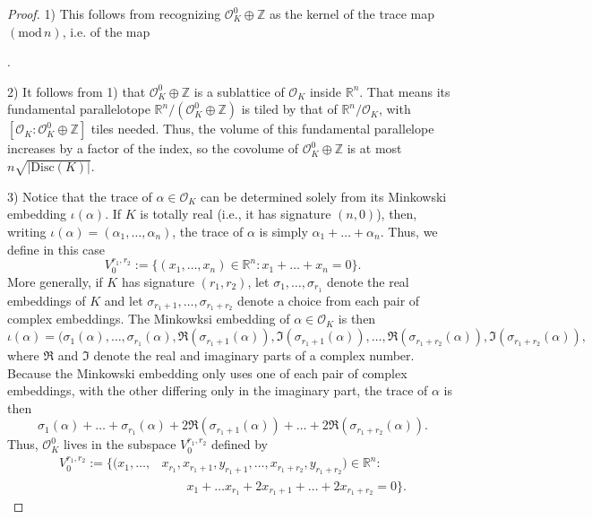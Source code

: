 \documentclass[12pt]{amsart}
\theoremstyle{definition} \newtheorem*{notation}{Notation}
\theoremstyle{remark} \newtheorem*{remark}{Remark}
\theoremstyle{remark} \newtheorem*{example}{Example}
\theoremstyle{definition} \newtheorem*{definition}{Definition}
\theoremstyle{definition} \newtheorem*{question}{Question}
\numberwithin{equation}{section}
\numberwithin{theorem}{section}
\renewcommand{\pmod}[1]{\left(\mathrm{mod}\,#1\right)}
\begin{document}
	\begin{proof}
		1) This follows from recognizing $\mathcal{O}_K^0 \oplus \mathbb{Z}$ as the kernel of the trace map $\pmod{n}$, i.e. of the map
			.
			
		2) It follows from 1) that $\mathcal{O}_K^0 \oplus \mathbb{Z}$ is a sublattice of $\mathcal{O}_K$ inside $\mathbb{R}^n$.  That means its fundamental parallelotope $\mathbb{R}^n / (\mathcal{O}_K^0 \oplus \mathbb{Z})$ is tiled by that of $\mathbb{R}^n / \mathcal{O}_K$, with $[\mathcal{O}_K : \mathcal{O}_K^0 \oplus \mathbb{Z}]$ tiles needed.  Thus, the volume of this fundamental parallelope increases by a factor of the index, so the covolume of $\mathcal{O}_K^0 \oplus \mathbb{Z}$ is at most $n \sqrt{|\mathrm{Disc}(K)|}$.
		
		3) Notice that the trace of $\alpha \in \mathcal{O}_K$ can be determined solely from its Minkowski embedding $\iota(\alpha)$.  If $K$ is totally real (i.e., it has signature $(n,0)$), then, writing $\iota(\alpha) = (\alpha_1,\dots,\alpha_n)$, the trace of $\alpha$ is simply $\alpha_1 + \dots + \alpha_n$.  Thus, we define in this case
			\[
				V_0^{r_1,r_2} := \{ (x_1,\dots,x_n) \in \mathbb{R}^n : x_1 + \dots + x_n = 0\}.
			\]
		More generally, if $K$ has signature $(r_1,r_2)$, let $\sigma_1,\dots,\sigma_{r_1}$ denote the real embeddings of $K$ and let $\sigma_{r_1+1},\dots,\sigma_{r_1+r_2}$ denote a choice from each pair of complex embeddings.  The Minkowksi embedding of $\alpha \in \mathcal{O}_K$ is then
			\[
				\iota(\alpha) = (\sigma_1(\alpha),\dots,\sigma_{r_1}(\alpha),\Re(\sigma_{r_1+1}(\alpha)),\Im(\sigma_{r_1+1}(\alpha)),\dots,\Re(\sigma_{r_1+r_2}(\alpha)),\Im(\sigma_{r_1+r_2}(\alpha)),
			\]
		where $\Re$ and $\Im$ denote the real and imaginary parts of a complex number.  Because the Minkowski embedding only uses one of each pair of complex embeddings, with the other differing only in the imaginary part, the trace of $\alpha$ is then
			\[
				\sigma_1(\alpha)+\dots+\sigma_{r_1}(\alpha) + 2 \Re(\sigma_{r_1+1}(\alpha)) + \dots + 2\Re(\sigma_{r_1+r_2}(\alpha)).
			\]
		Thus, $\mathcal{O}_K^0$ lives in the subspace $V_0^{r_1,r_2}$ defined by
			\begin{align*}
				V_0^{r_1,r_2} := \{ (x_1,\dots,&x_{r_1},x_{r_1+1},y_{r_1+1},\dots,x_{r_1+r_2},y_{r_1+r_2}) \in \mathbb{R}^n :\\ 
					&\quad\quad x_1 + \dots x_{r_1} + 2x_{r_1+1} + \dots + 2x_{r_1+r_2} = 0\}.
			\end{align*}
			

\end{proof}
\end{document}

